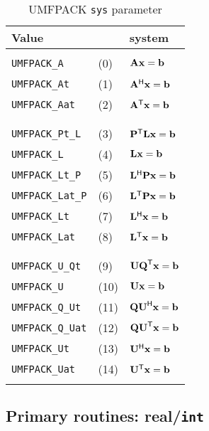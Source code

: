\documentclass[11pt]{article}
\newcommand{\m}[1]{{\bf{#1}}}       %
\newcommand{\tr}{^{\sf T}}          %
\newcommand{\he}{^{\sf H}}          %
\begin{document}
\begin{table}
\begin{center}
\caption{UMFPACK {\tt sys} parameter}
\label{sys}
{\footnotesize
\begin{tabular}{ll|l}
\hline
Value & & system \\
\hline
& & \\
{\tt UMFPACK\_A}      &  (0) & $\m{Ax}=\m{b}$ \\
{\tt UMFPACK\_At}     &  (1) & $\m{A}\he\m{x}=\m{b}$ \\
{\tt UMFPACK\_Aat}    &  (2) & $\m{A}\tr\m{x}=\m{b}$ \\
& & \\
\hline
& & \\
{\tt UMFPACK\_Pt\_L}  &  (3) & $\m{P}\tr\m{Lx}=\m{b}$ \\
{\tt UMFPACK\_L}      &  (4) & $\m{Lx}=\m{b}$ \\
{\tt UMFPACK\_Lt\_P}  &  (5) & $\m{L}\he\m{Px}=\m{b}$ \\
{\tt UMFPACK\_Lat\_P} &  (6) & $\m{L}\tr\m{Px}=\m{b}$ \\
{\tt UMFPACK\_Lt}     &  (7) & $\m{L}\he\m{x}=\m{b}$ \\
{\tt UMFPACK\_Lat}    &  (8) & $\m{L}\tr\m{x}=\m{b}$ \\
& & \\
\hline
& & \\
{\tt UMFPACK\_U\_Qt}  &  (9) & $\m{UQ}\tr\m{x}=\m{b}$ \\
{\tt UMFPACK\_U}      & (10) & $\m{Ux}=\m{b}$ \\
{\tt UMFPACK\_Q\_Ut}  & (11) & $\m{QU}\he\m{x}=\m{b}$ \\
{\tt UMFPACK\_Q\_Uat} & (12) & $\m{QU}\tr\m{x}=\m{b}$ \\
{\tt UMFPACK\_Ut}     & (13) & $\m{U}\he\m{x}=\m{b}$ \\
{\tt UMFPACK\_Uat}    & (14) & $\m{U}\tr\m{x}=\m{b}$ \\
& & \\
\hline
\end{tabular}
}
\end{center}
\end{table}

\subsection{Primary routines: real/{\tt int}}
\end{document}
